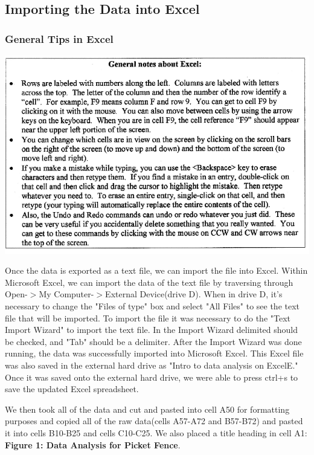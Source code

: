 \documentclass[aps,letterpaper,11pt]{revtex4}
\begin{document}
\subsection{Importing the Data into Excel}

\subsubsection{General Tips in Excel}

\begin{center}
\includegraphics[width=6in]{GeneralNotesExcel.png}
\end{center}

Once the data is exported as a text file, we can import the file into Excel. Within Microsoft Excel, we can import the data of the text file by traversing through Open-$>$My Computer-$>$External Device(drive D). When in drive D, it's necessary to change the "Files of type" box and select "All Files" to see the text file that will be imported. To import the file it was necessary to do the "Text Import Wizard" to import the text file. In the Import Wizard delimited should be checked, and "Tab" should be a delimiter. After the Import Wizard was done running, the data was successfully imported into Microsoft Excel. This Excel file was also saved in the external hard drive as "Intro to data analysis on ExcelE." Once it was saved onto the external hard drive, we were able to press ctrl+s to save the updated Excel spreadsheet. 

We then took all of the data and cut and pasted into cell A50 for formatting purposes and copied all of the raw data(cells A57-A72 and B57-B72) and pasted it into cells B10-B25 and cells C10-C25. We also placed a title heading in cell A1: \textbf{Figure 1: Data Analysis for Picket Fence}. 
\end{document}
